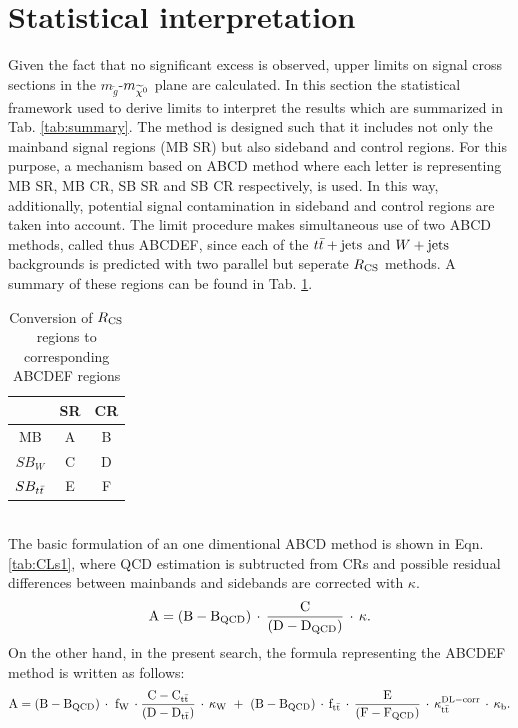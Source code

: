 \section{Statistical interpretation}
\label{LimitProc}
Given the fact that no significant excess is observed, upper limits on signal cross sections in the $m_{\tilde{g}}$-$m_{\widetilde{\chi}^0}$ plane are calculated. In this section the statistical framework used to derive limits to interpret the results which are summarized in Tab. \ref{tab:summary}. The method is designed such that it includes not only the mainband signal regions (MB SR) but also sideband and control regions. For this purpose, a mechanism based on ABCD method where each letter is representing MB SR, MB CR, SB SR and SB CR respectively, is used. In this way, additionally, potential signal contamination in sideband and control regions are taken into account.
The limit procedure makes simultaneous use of two ABCD methods, called thus ABCDEF, since each of the $t\bar{t}+\textrm{jets}$ and $W+\textrm{jets}$ backgrounds is predicted with two parallel but seperate $R_{\rm CS}$ methods. A summary of these regions can be found in Tab. \ref{tab:RCStoABCD}.
 \renewcommand{\arraystretch}{1.5}
\begin{table}[!htb]
\caption{Conversion of $R_{\rm CS}$ regions to corresponding ABCDEF regions}
\label{tab:RCStoABCD}
\centering
\begin{tabular}{c|c|c}
                             & SR   & CR \\ \hline
MB & A & B \\ \hline
$SB_{W}$      & C & D \\ \hline
 $SB_{t\bar{t}}$    & E & F \\
\end{tabular}
\end{table}
\renewcommand{\arraystretch}{1.0}\\
The basic formulation of an one dimentional ABCD method is shown in Eqn.\ref{tab:CLs1}, where QCD estimation is subtructed from CRs and possible residual differences between mainbands and sidebands are corrected with $\kappa$.
\begin{equation}
\label{tab:CLs1}
{\rm A}={\rm (B-B_{QCD})\,\cdot\,\frac{C}{(D-D_{QCD})}\,\cdot\,\kappa}.
\end{equation}
On the other hand,  in the present search, the formula representing the ABCDEF method is written as follows:
\begin{equation}
\label{tab:CLs2}
{\rm A}={\rm (B-B_{QCD})\,\cdot\,\,f_W\,\cdot\frac{C-C_{t\bar{t}}}{(D-D_{t\bar{t}})}\,\cdot\,\kappa_W\,\,+\,\, \rm (B-B_{QCD})\,\cdot\,f_{t\bar{t}}\,\cdot\, \frac{E}{(F-F_{QCD})}\,\cdot\,\kappa_{t\bar{t}}^{DL-corr}\,\cdot\, \kappa_{b} }.
\end{equation}
